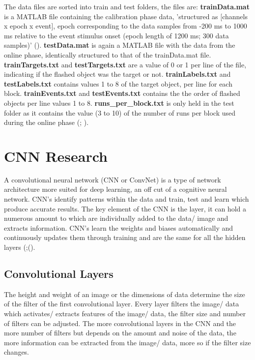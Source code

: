 The data files are sorted into train and test folders, the files are: \textbf{trainData.mat} is a MATLAB file containing the calibration phase data, 'structured as [channels x epoch x event], epoch corresponding to the data samples from -200 ms to 1000 ms relative to the event stimulus onset (epoch length of 1200 ms; 300 data samples)' (\cite{DatasetPaper}). \textbf{testData.mat} is again a MATLAB file with the data from the online phase, identically structured to that of the trainData.mat file. \textbf{trainTargets.txt} and \textbf{testTargets.txt} are a value of 0 or 1 per line of the file, indicating if the flashed object was the target or not. \textbf{trainLabels.txt} and \textbf{testLabels.txt} contains values 1 to 8 of the target object, per line for each block. \textbf{trainEvents.txt} and \textbf{testEvents.txt} contains the the order of flashed objects per line values 1 to 8. \textbf{runs\_per\_block.txt} is only held in the test folder as it contains the value (3 to 10) of the number of runs per block used during the online phase (\cite{DatasetPaper}; \cite{Kaggle}).


\section{CNN Research}
\label{CNN Research SubSection}

A convolutional neural network (CNN or ConvNet) is a type of network architecture more suited for deep learning, an off cut of a cognitive neural network. CNN's identify patterns within the data and train, test and learn which produce accurate results. The key element of the CNN is the layer, it can hold a numerous amount to which are individually added to the data/ image and extracts information. CNN's learn the weights and biases automatically and continuously updates them through training and are the same for all the hidden layers (\cite{UnderstandCNN};(\cite{whatiscnn}). 

\subsection{Convolutional Layers}

The height and weight of an image or the dimensions of data determine the size of the filter of the first convolutional layer. Every layer filters the image/ data which activates/ extracts features of the image/ data, the filter size and number of filters can be adjusted. The more convolutional layers in the CNN and the more number of filters but depends on the amount and noise of the data, the more information can be extracted from the image/ data, more so if the filter size changes. 

